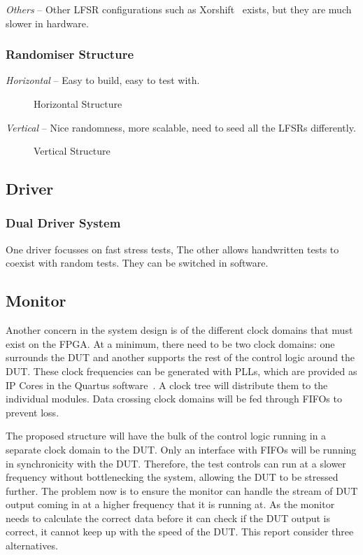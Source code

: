 \textit{Others} --
Other LFSR configurations such as Xorshift~\cite{Marsaglia1} exists, but they are much slower in hardware.

\subsubsection{Randomiser Structure}

\textit{Horizontal} --
Easy to build, easy to test with.

\begin{figure}[ht]
  \centering
  
  \caption{Horizontal Structure}
  \label{HoriLFSR}
\end{figure}

\textit{Vertical} --
Nice randomness, more scalable, need to seed all the LFSRs differently.

\begin{figure}[ht]
  \centering
  
  \caption{Vertical Structure}
  \label{VertLFSR}
\end{figure}

\subsection{Driver}
\subsubsection{Dual Driver System}
One driver focusses on fast stress tests,
The other allows handwritten tests to coexist with random tests.
They can be switched in software.

\subsection{Monitor}

Another concern in the system design is of the different clock domains that
must exist on the FPGA.
At a minimum, there need to be two clock domains: one surrounds the DUT and
another supports the rest of the control logic around the DUT.
These clock frequencies can be generated with PLLs, which are
provided as IP Cores in the Quartus software~\cite{Altera4}.
A clock tree will distribute them to the individual modules.
Data crossing clock domains will be fed through FIFOs to prevent loss.

The proposed structure will have the bulk of the control logic running
in a separate clock domain to the DUT.
Only an interface with FIFOs will be running in synchronicity
with the DUT.
Therefore, the test controls can run at a slower frequency without
bottlenecking the system, allowing the DUT to be stressed further.
The problem now is to ensure the monitor can handle the stream of DUT output
coming in at a higher frequency that it is running at.
As the monitor needs to calculate the correct data before it can check if the
DUT output is correct, it cannot keep up with the speed of the DUT.
This report consider three alternatives.


